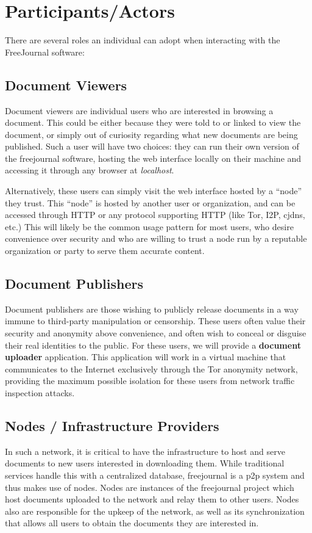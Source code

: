 \documentclass[letterpaper,10pt,oneside]{sphinxmanual}
\begin{document}
\section{Participants/Actors}
There are several roles an individual can adopt when interacting with the FreeJournal software:
\label{design:participants-actors}


\subsection{Document Viewers}
\label{design:document-viewers}
Document viewers are individual users who are interested in browsing a document.  This could be either because they were
told to or linked to view the document, or simply out of curiosity regarding what new documents are being published.
Such a user will have two choices: they can run their own version of the freejournal software, hosting the web interface
locally on their machine and accessing it through any browser at \emph{localhost}.

Alternatively, these users can simply visit the web interface hosted by a ``node'' they trust.  This ``node'' is hosted by
another user or organization, and can be accessed through HTTP or any protocol supporting HTTP (like Tor, I2P, cjdns, etc.)
This will likely be the common usage pattern for most users, who desire convenience over security and who are willing to
trust a node run by a reputable organization or party to serve them accurate content.


\subsection{Document Publishers}
\label{design:document-publishers}
Document publishers are those wishing to publicly release documents in a way immune to third-party manipulation or censorship.
These users often value their security and anonymity above convenience, and often wish to conceal or disguise their real
identities to the public.  For these users, we will provide a \textbf{document uploader} application.  This application will work
in a virtual machine that communicates to the Internet exclusively through the Tor anonymity network, providing the maximum
possible isolation for these users from network traffic inspection attacks.


\subsection{Nodes / Infrastructure Providers}
\label{design:nodes-infrastructure-providers}
In such a network, it is critical to have the infrastructure to host and serve documents to new users interested in downloading
them.  While traditional services handle this with a centralized database, freejournal is a p2p system and thus makes use of
nodes.  Nodes are instances of the freejournal project which host documents uploaded to the network and relay them to other
users.  Nodes also are responsible for the upkeep of the network, as well as its synchronization that allows all users to
obtain the documents they are interested in.
\end{document}
